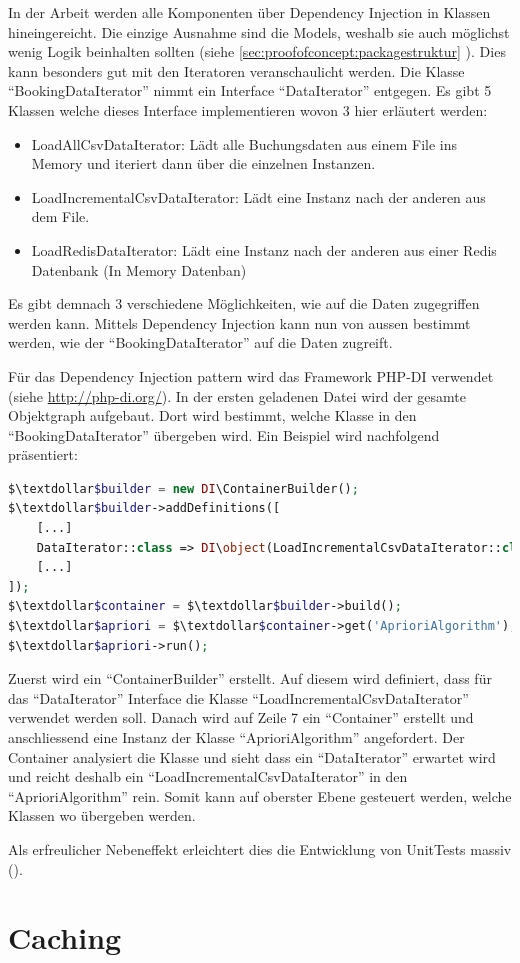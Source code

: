 In der Arbeit werden alle Komponenten über Dependency Injection in Klassen hineingereicht. Die einzige Ausnahme sind die Models, weshalb sie auch möglichst wenig Logik beinhalten sollten (siehe \cref{sec:proofofconcept:packagestruktur} ). Dies kann besonders gut mit den Iteratoren veranschaulicht werden. Die Klasse "`BookingDataIterator"' nimmt ein Interface "`DataIterator"' entgegen. Es gibt 5 Klassen welche dieses Interface implementieren wovon 3 hier erläutert werden:
\begin{itemize}
	\item LoadAllCsvDataIterator: Lädt alle Buchungsdaten aus einem File ins Memory und iteriert dann über die einzelnen Instanzen.
	\item LoadIncrementalCsvDataIterator: Lädt eine Instanz nach der anderen aus dem File.
	\item LoadRedisDataIterator: Lädt eine Instanz nach der anderen aus einer Redis Datenbank (In Memory Datenban)
\end{itemize}

Es gibt demnach 3 verschiedene Möglichkeiten, wie auf die Daten zugegriffen werden kann. Mittels Dependency Injection kann nun von aussen bestimmt werden, wie der "`BookingDataIterator"' auf die Daten zugreift.

Für das Dependency Injection \gls{pattern}
 wird das Framework PHP-DI verwendet (siehe \url{http://php-di.org/}). In der ersten geladenen Datei wird der gesamte Objektgraph aufgebaut. Dort wird bestimmt, welche Klasse in den "`BookingDataIterator"' übergeben wird. Ein Beispiel wird nachfolgend präsentiert:
 
\begin{lstlisting}[language=php]
$\textdollar$builder = new DI\ContainerBuilder();
$\textdollar$builder->addDefinitions([
    [...]
    DataIterator::class => DI\object(LoadIncrementalCsvDataIterator::class),
    [...]
]);
$\textdollar$container = $\textdollar$builder->build();
$\textdollar$apriori = $\textdollar$container->get('AprioriAlgorithm');
$\textdollar$apriori->run();
\end{lstlisting}

Zuerst wird ein "`ContainerBuilder"' erstellt. Auf diesem wird definiert, dass für das "`DataIterator"' Interface die Klasse "`LoadIncrementalCsvDataIterator"' verwendet werden soll. Danach wird auf Zeile 7 ein "`Container"' erstellt und anschliessend eine Instanz der Klasse "`AprioriAlgorithm"' angefordert. Der Container analysiert die Klasse und sieht dass ein "`DataIterator"' erwartet wird und reicht deshalb ein "`LoadIncrementalCsvDataIterator"' in den "`AprioriAlgorithm"' rein. Somit kann auf oberster Ebene gesteuert werden, welche Klassen wo übergeben werden.

Als erfreulicher Nebeneffekt erleichtert dies die Entwicklung von UnitTests massiv ().

\section{Caching}
\label{sec:proofofconcept:caching}